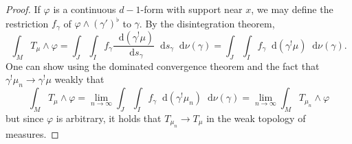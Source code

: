\documentclass[reqno,11pt]{amsart}
\newcommand*\dif{\mathop{}\!\mathrm{d}}
\theoremstyle{definition}
\numberwithin{equation}{section}
\begin{document}
\begin{proof}
	If $\varphi$ is a continuous $d-1$-form with support near $x$, we may define the restriction $f_\gamma$ of $\varphi \wedge (\gamma')^\flat$ to $\gamma$.
	By the disintegration theorem,
	$$\int_M T_\mu \wedge \varphi = \int_J \int_I f_\gamma \frac{\dif(\gamma^! \mu)}{\dif s_\gamma} \dif s_\gamma \dif \nu(\gamma) = \int_J \int_I f_\gamma \dif(\gamma^! \mu) \dif \nu(\gamma).$$
	One can show using the dominated convergence theorem and the fact that $\gamma^! \mu_n \to \gamma^! \mu$ weakly that 
	$$\int_M T_\mu \wedge \varphi = \lim_{n \to \infty} \int_J \int_I f_\gamma \dif(\gamma^! \mu_n) \dif \nu(\gamma) = \lim_{n \to \infty} \int_M T_{\mu_n} \wedge \varphi$$
	but since $\varphi$ is arbitrary, it holds that $T_{\mu_n} \to T_\mu$ in the weak topology of measures.
\end{proof}


\printbibliography
\end{document}
